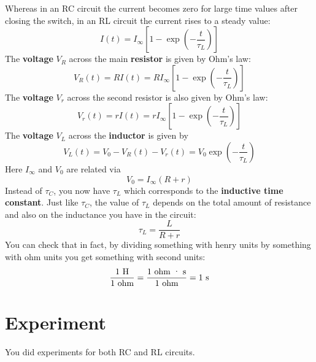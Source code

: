 Whereas in an RC circuit the current becomes zero for large time values after closing the switch, in an RL circuit the current rises to a steady value:
\begin{equation}
    I(t) = I_{\infty} \left[ 1 - \exp\left(- \frac{t}{\tau_{L}}\right) \right]
    \label{eq.05.RL.i.rise}
\end{equation}
The \textbf{voltage} $V_{R}$ across the main \textbf{resistor} is given by Ohm's law:
\begin{equation}
    V_{R}(t) = R I(t) = R I_{\infty} \left[ 1 - \exp\left(- \frac{t}{\tau_{L}}\right) \right]
    \label{eq.05.RL.vR}
\end{equation}
The \textbf{voltage} $V_{r}$ across the second resistor is also given by Ohm's law:
\begin{equation}
    V_{r}(t) = r I(t) = r I_{\infty} \left[ 1 - \exp\left(- \frac{t}{\tau_{L}}\right) \right]
    \label{eq.05.RL.vr}
\end{equation}
The \textbf{voltage} $V_{L}$ across the \textbf{inductor} is given by
\begin{equation}
    V_{L}(t) = V_{0} - V_{R}(t) - V_{r}(t) = V_{0} \exp\left(- \frac{t}{\tau_{L}}\right)
    \label{eq.05.RL.vL}
\end{equation}
Here $I_{\infty}$ and $V_{0}$ are related via
\begin{equation}
    V_{0} = I_{\infty} \left(R + r\right)
\end{equation}
Instead of $\tau_{C}$, you now have $\tau_{L}$ which corresponds to the \textbf{inductive time constant}. Just like $\tau_{C}$, the value of $\tau_{L}$ depends on the total amount of resistance and also on the inductance you have in the circuit:
\begin{equation}
    \tau_{L} = \frac{L}{R + r}
    \label{eq.05.tauL}
\end{equation}
You can check that in fact, by dividing something with henry units by something with ohm units you get something with second units:
\begin{equation}
    \frac{1 \ \text{H}}{1 \ \text{ohm}} = \frac{1 \ \text{ohm {\textperiodcentered} s}}{1 \ \text{ohm}} = 1 \ \text{s}
\end{equation}
%
\section{Experiment}
%
You did experiments for both RC and RL circuits.
%
